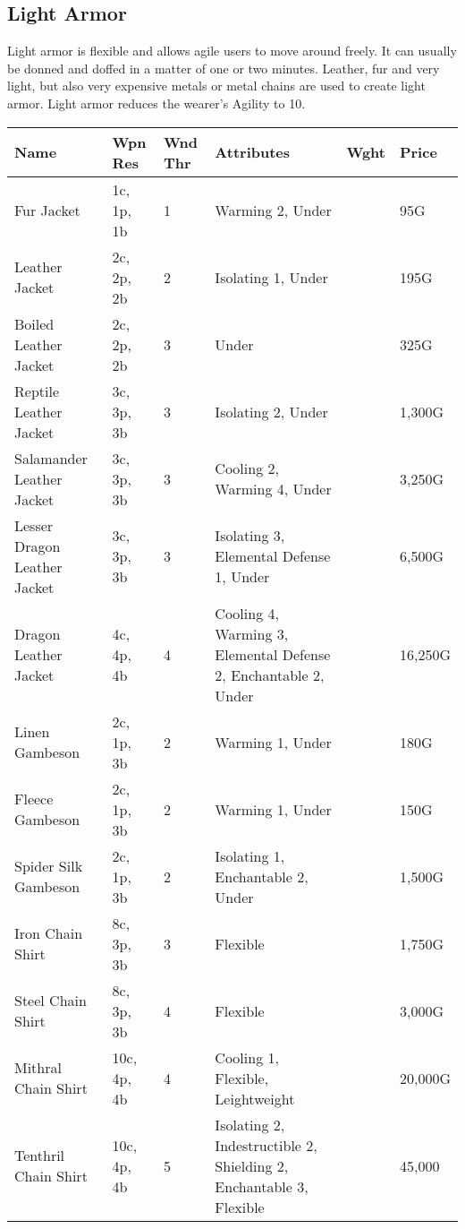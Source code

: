 \subsection{Light Armor}

Light armor is flexible and allows agile users to move around freely. It can usually be donned and doffed in a matter of one or two minutes. Leather, fur and very light, but also very expensive metals or metal chains are used to create light armor.
Light armor reduces the wearer's Agility to 10. 

\begin{longtable}{p{3.5cm} | p{1.5cm} | p{0.75cm} | p{4cm} | p{1cm} | p{1.25cm}}
	Name & Wpn Res & Wnd Thr &  Attributes & Wght & Price\\ \hline
	Fur Jacket & 1c, 1p, 1b & 1 & Warming 2, Under &  & 95G\\
	
	Leather Jacket & 2c, 2p, 2b & 2 & Isolating 1, Under &  & 195G\\
	
	Boiled Leather Jacket & 2c, 2p, 2b & 3 & Under &  & 325G\\
	
	Reptile Leather Jacket & 3c, 3p, 3b & 3 & Isolating 2, Under &  & 1,300G\\
	
	Salamander Leather Jacket & 3c, 3p, 3b & 3 & Cooling 2, Warming 4, Under &  & 3,250G\\
	
	Lesser Dragon Leather Jacket & 3c, 3p, 3b & 3 & Isolating 3, Elemental Defense 1, Under &  & 6,500G\\
	
	Dragon Leather Jacket & 4c, 4p, 4b & 4 & Cooling 4, Warming 3, Elemental Defense 2, Enchantable 2, Under &  & 16,250G\\
	
	Linen Gambeson & 2c, 1p, 3b & 2 & Warming 1, Under &  & 180G\\
	
	Fleece Gambeson & 2c, 1p, 3b & 2 & Warming 1, Under &  & 150G\\
	
	Spider Silk Gambeson & 2c, 1p, 3b & 2 & Isolating 1, Enchantable 2, Under &  & 1,500G\\
	
	Iron Chain Shirt & 8c, 3p, 3b  & 3 & Flexible &  & 1,750G\\
	
	Steel Chain Shirt & 8c, 3p, 3b & 4 & Flexible &  & 3,000G\\
	
	Mithral Chain Shirt & 10c, 4p, 4b & 4 & Cooling 1, Flexible, Leightweight &  & 20,000G\\
	
	Tenthril Chain Shirt & 10c, 4p, 4b & 5 & Isolating 2, Indestructible 2, Shielding 2, Enchantable 3, Flexible &  & 45,000\\
\end{longtable}